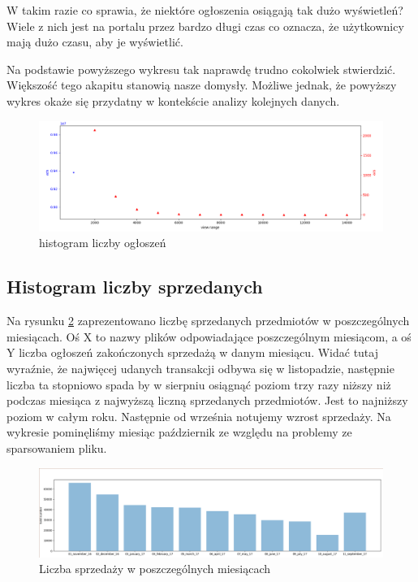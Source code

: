 \documentclass[a4paper,11pt]{article}
\begin{document}
W takim razie co sprawia, że niektóre ogłoszenia osiągają tak dużo wyświetleń? Wiele z nich jest na portalu przez bardzo długi czas co oznacza, że użytkownicy mają dużo czasu, aby je wyświetlić.

Na podstawie powyższego wykresu tak naprawdę trudno cokolwiek stwierdzić. Większość tego akapitu stanowią nasze domysły. Możliwe jednak, że powyższy wykres okaże się przydatny w kontekście analizy kolejnych danych.

\begin{figure}[!ht]
\centering
\includegraphics[width=1.0\textwidth]{images/liczba_ogloszen_Liczba_wyswietlen.png}
\caption{\label{fig:adsViewsNumber} histogram liczby ogłoszeń}
\end{figure}

\subsection{Histogram liczby sprzedanych}
Na rysunku \ref{fig:soldNumber} zaprezentowano liczbę sprzedanych przedmiotów w poszczególnych miesiącach. Oś X to nazwy plików odpowiadające poszczególnym miesiącom, a oś Y liczba ogłoszeń zakończonych sprzedażą w danym miesiącu. Widać tutaj wyraźnie, że najwięcej udanych transakcji odbywa się w listopadzie, następnie liczba ta stopniowo spada by w sierpniu osiągnąć poziom trzy razy niższy niż podczas miesiąca z najwyższą liczną sprzedanych przedmiotów. Jest to najniższy poziom w całym roku. Następnie od września notujemy wzrost sprzedaży. Na wykresie pominęliśmy miesiąc październik ze względu na problemy ze sparsowaniem pliku.

\begin{figure}[!ht]
\centering
\includegraphics[width=1.0\textwidth]{images/sold_number.png}
\caption{\label{fig:soldNumber} Liczba sprzedaży w poszczególnych miesiącach}
\end{figure}
\end{document}
